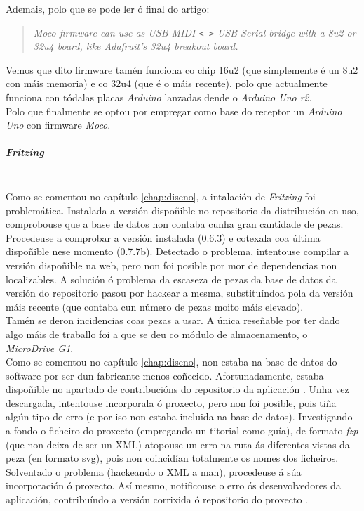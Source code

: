     Ademais, polo que se pode ler ó final do artigo:

    \begin{quotation}
     \slshape
     Moco firmware can use as USB-MIDI \verb|<->| USB-Serial bridge with a 8u2
     or 32u4 board, like Adafruit’s 32u4 breakout board.
    \end{quotation}

    Vemos que dito firmware tamén funciona co chip 16u2 (que simplemente é un
    8u2 con máis memoria) e co 32u4 (que é o máis recente), polo que
    actualmente funciona con tódalas placas \textit{Arduino} lanzadas dende o
    \textit{Arduino Uno r2}. \\

    Polo que finalmente se optou por empregar como base do receptor un
    \textit{Arduino Uno} con firmware \textit{Moco}.

    \subparagraph{Fritzing}\mbox{}\\

    Como se comentou no capítulo \ref{chap:diseno}, a intalación de
    \textit{Fritzing} foi problemática. Instalada a versión dispoñible no
    repositorio da distribución en uso, comprobouse que a base de datos non
    contaba cunha gran cantidade de pezas. Procedeuse a comprobar a versión
    instalada (0.6.3) e cotexala coa última dispoñible nese momento (0.7.7b).
    Detectado o problema, intentouse compilar a versión dispoñible na web, pero
    non foi posible por mor de dependencias non localizables. A solución ó
    problema da escaseza de pezas da base de datos da versión do repositorio
    pasou por hackear a mesma, substituíndoa pola da versión máis recente (que
    contaba cun número de pezas moito máis elevado). \\

    Tamén se deron incidencias coas pezas a usar. A única reseñable por ter
    dado algo máis de traballo foi a que se deu co módulo de almacenamento, o
    \textit{MicroDrive G1}. \\

    Como se comentou no capítulo \ref{chap:diseno}, non estaba na base de datos
    do software por ser dun fabricante menos coñecido. Afortunadamente, estaba
    dispoñible no apartado de contribucións do repositorio da aplicación
    \cite{FioContribucionsFritzing}. Unha vez descargada, intentouse
    incorporala ó proxecto, pero non foi posible, pois tiña algún tipo de erro
    (e por iso non estaba incluida na base de datos). Investigando a fondo o
    ficheiro do proxecto (empregando un titorial \cite{TitorialFritzing} como
    guía), de formato \textit{fzp} (que non deixa de ser un XML) atopouse un
    erro na ruta ás diferentes vistas da peza (en formato svg), pois non
    coincidían totalmente os nomes dos ficheiros. Solventado o problema
    (hackeando o XML a man), procedeuse á súa incorporación ó proxecto. Así
    mesmo, notificouse o erro ós desenvolvedores da aplicación, contribuíndo a
    versión corrixida ó repositorio do proxecto \cite{ContribucionFritzing}.
    
